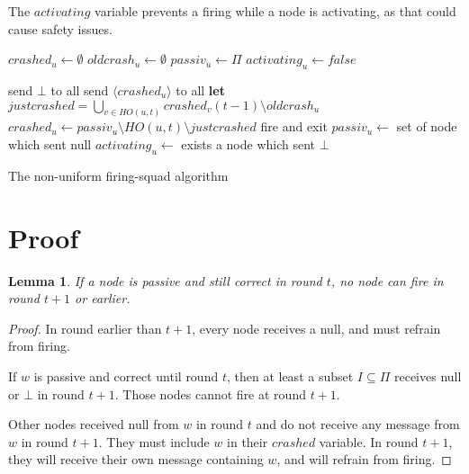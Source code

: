 \documentclass{article}
\newtheorem{lemma}{Lemma}
\begin{document}
The $activating$ variable prevents a firing while a node is activating, as that could cause safety issues.

\begin{algorithm}[htb]\label{algo:code}
\begin{distribalgo}[1]
\BLANK {}
	\STATE $crashed_u \leftarrow \emptyset$
	\STATE $oldcrash_u \leftarrow \emptyset$
	\STATE $passiv_u \leftarrow \Pi$
	\STATE $activating_u \leftarrow false$

\ENDINDENT \BLANK

			\STATE send $\bot$ to all
		\ELSE
			\STATE send $\langle crashed_u \rangle$ to all
		\ENDIF
	\ENDINDENT \BLANK
		\STATE \textbf{let} $justcrashed = \bigcup\limits_{v \in HO(u,t)} crashed_v(t-1) \setminus oldcrash_u$  \label{line:detected-before}
		\STATE $crashed_u \leftarrow passiv_u \setminus HO(u, t) \setminus justcrashed$ \label{line:detect}
			\STATE fire and exit
		\ENDIF
		\STATE $passiv_u \leftarrow $ set of node which sent null
		\STATE $activating_u \leftarrow $ exists a node which sent $\bot$
	\ENDINDENT 
\ENDINDENT 

\caption{The non-uniform firing-squad algorithm} \label{algo:R}
\end{distribalgo}

\end{algorithm}

\section{Proof}

\begin{lemma} \label{lem:passiv-wait}
	If a node is passive and still correct in round $t$, no node can fire in round $t+1$ or earlier.
\end{lemma}
\begin{proof}
	In round earlier than $t+1$, every node receives a null, and must refrain from firing.

	If $w$ is passive and correct until round $t$, then at least a subset $I \subseteq \Pi$ receives null or $\bot$ in round $t+1$.
	Those nodes cannot fire at round $t+1$.

	Other nodes received null from $w$ in round $t$ and do not receive any message from $w$ in round $t+1$.
	They must include $w$ in their $crashed$ variable. In round $t+1$, they will receive their own message containing $w$, and will refrain from firing.
\end{proof}
\end{document}
